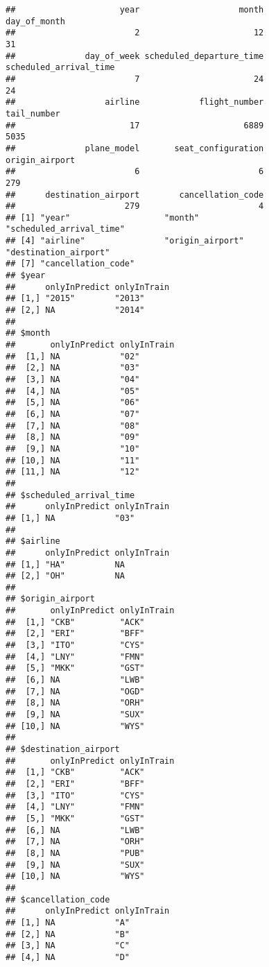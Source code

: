 \documentclass{article}\usepackage[]{graphicx}\usepackage[]{color}
\makeatletter
\newenvironment{kframe}{%
 \def\at@end@of@kframe{}%
 \ifinner\ifhmode%
  \def\at@end@of@kframe{\end{minipage}}%
  \begin{minipage}{\columnwidth}%
 \fi\fi%
 \def\FrameCommand##1{\hskip\@totalleftmargin \hskip-\fboxsep
 \colorbox{shadecolor}{##1}\hskip-\fboxsep
     \hskip-\linewidth \hskip-\@totalleftmargin \hskip\columnwidth}%
 \MakeFramed {\advance\hsize-\width
   \@totalleftmargin\z@ \linewidth\hsize
   \@setminipage}}%
 {\par\unskip\endMakeFramed%
 \at@end@of@kframe}
\newenvironment{knitrout}{}{} %
\makeatother
\begin{document}
\begin{knitrout}
\color{fgcolor}\begin{kframe}
\begin{verbatim}
##                     year                    month             day_of_month 
##                        2                       12                       31 
##              day_of_week scheduled_departure_time   scheduled_arrival_time 
##                        7                       24                       24 
##                  airline            flight_number              tail_number 
##                       17                     6889                     5035 
##              plane_model       seat_configuration           origin_airport 
##                        6                        6                      279 
##      destination_airport        cancellation_code 
##                      279                        4
## [1] "year"                   "month"                  "scheduled_arrival_time"
## [4] "airline"                "origin_airport"         "destination_airport"   
## [7] "cancellation_code"
## $year
##      onlyInPredict onlyInTrain
## [1,] "2015"        "2013"     
## [2,] NA            "2014"     
## 
## $month
##       onlyInPredict onlyInTrain
##  [1,] NA            "02"       
##  [2,] NA            "03"       
##  [3,] NA            "04"       
##  [4,] NA            "05"       
##  [5,] NA            "06"       
##  [6,] NA            "07"       
##  [7,] NA            "08"       
##  [8,] NA            "09"       
##  [9,] NA            "10"       
## [10,] NA            "11"       
## [11,] NA            "12"       
## 
## $scheduled_arrival_time
##      onlyInPredict onlyInTrain
## [1,] NA            "03"       
## 
## $airline
##      onlyInPredict onlyInTrain
## [1,] "HA"          NA         
## [2,] "OH"          NA         
## 
## $origin_airport
##       onlyInPredict onlyInTrain
##  [1,] "CKB"         "ACK"      
##  [2,] "ERI"         "BFF"      
##  [3,] "ITO"         "CYS"      
##  [4,] "LNY"         "FMN"      
##  [5,] "MKK"         "GST"      
##  [6,] NA            "LWB"      
##  [7,] NA            "OGD"      
##  [8,] NA            "ORH"      
##  [9,] NA            "SUX"      
## [10,] NA            "WYS"      
## 
## $destination_airport
##       onlyInPredict onlyInTrain
##  [1,] "CKB"         "ACK"      
##  [2,] "ERI"         "BFF"      
##  [3,] "ITO"         "CYS"      
##  [4,] "LNY"         "FMN"      
##  [5,] "MKK"         "GST"      
##  [6,] NA            "LWB"      
##  [7,] NA            "ORH"      
##  [8,] NA            "PUB"      
##  [9,] NA            "SUX"      
## [10,] NA            "WYS"      
## 
## $cancellation_code
##      onlyInPredict onlyInTrain
## [1,] NA            "A"        
## [2,] NA            "B"        
## [3,] NA            "C"        
## [4,] NA            "D"
\end{verbatim}
\end{kframe}
\end{knitrout}
\end{document}
